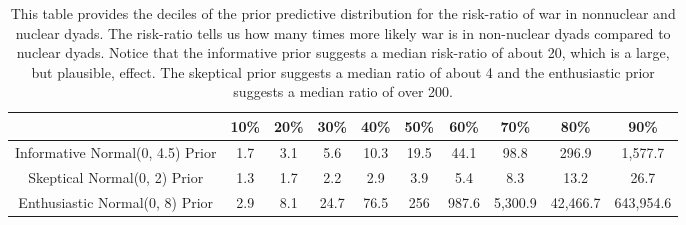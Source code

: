 \begin{table}[H]
\centering
{\scriptsize
\begin{tabular}{|cccccccccc|}
  \hline
 & 10\% & 20\% & 30\% & 40\% & 50\% & 60\% & 70\% & 80\% & 90\% \\ 
  \hline
Informative Normal(0, 4.5) Prior &       1.7 &       3.1 &       5.6 &      10.3 &      19.5 &      44.1 &      98.8 &     296.9 &   1,577.7 \\ 
  Skeptical Normal(0, 2) Prior &       1.3 &       1.7 &       2.2 &       2.9 &       3.9 &       5.4 &       8.3 &      13.2 &      26.7 \\ 
  Enthusiastic Normal(0, 8) Prior &       2.9 &       8.1 &      24.7 &      76.5 &       256 &     987.6 &   5,300.9 &  42,466.7 & 643,954.6 \\ 
   \hline
\end{tabular}
}
\caption{This table provides the deciles of the prior predictive distribution for the 
                  risk-ratio of war in nonnuclear and nuclear dyads. The risk-ratio
                  tells us how many times more likely war is in non-nuclear dyads compared 
                  to nuclear dyads. Notice that the informative prior suggests a median 
                  risk-ratio of about 20, which is a large, but plausible, effect. The skeptical prior suggests a median 
                  ratio of about 4 and the enthusiastic prior suggests a median ratio of over 
                  200.} 
\label{tab:bm-pppd-deciles}
\end{table}
